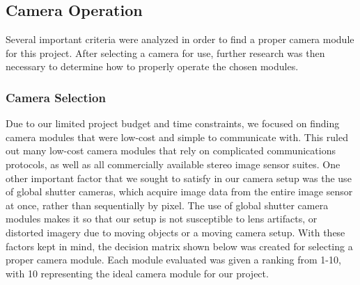 \subsection{Camera Operation}
Several important criteria were analyzed in order to find a proper camera module for this project. After selecting a  camera for use, further research was then necessary to determine how to properly operate the chosen modules. 
\subsubsection{Camera Selection}  \label{camdecision}
Due to our limited project budget and time constraints, we focused on finding camera modules that were low-cost and simple to communicate with. This ruled out many low-cost camera modules that rely on complicated communications protocols, as well as all commercially available stereo image sensor suites. One other important factor that we sought to satisfy in our camera setup was the use of global shutter cameras, which acquire image data from the entire image sensor at once, rather than sequentially by pixel. The use of global shutter camera modules makes it so that our setup is not susceptible to lens artifacts, or distorted imagery due to moving objects or a moving camera setup. With these factors kept in mind, the decision matrix shown below was created for selecting a proper camera module. Each module evaluated was given a ranking from 1-10, with 10 representing the ideal camera module for our project. 
\par
\singlespacing
